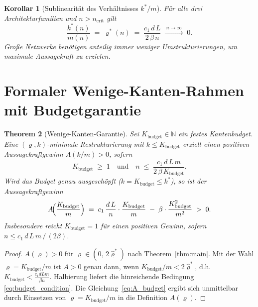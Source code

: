 \documentclass[12pt, a4paper, openany]{report}
\newtheorem{theorem}{Theorem}[chapter]
\newtheorem{corollary}[theorem]{Korollar}
\newcommand{\N}{\mathbb{N}}
\begin{document}
\begin{corollary}[Sublinearität des Verhältnisses $k^*/m$]
\label{cor:k_over_m}
Für alle drei Architekturfamilien und $n > n_{\mathrm{crit}}$ gilt
\[
  \frac{k^*(n)}{m(n)} \;=\; \varrho^*(n) \;=\;
  \frac{c_1\,d\,L}{2\,\beta\,n}
  \;\xrightarrow{\;n\to\infty\;}\; 0.
\]
Große Netzwerke benötigen \emph{anteilig immer weniger Umstrukturierungen},
um maximale Aussagekraft zu erzielen.
\end{corollary}

\section{Formaler Wenige-Kanten-Rahmen mit Budgetgarantie}
\label{sec:scaling_budget}

\begin{theorem}[Wenige-Kanten-Garantie]
\label{thm:few_edges_guarantee}
Sei $K_{\mathrm{budget}} \in \N$ ein festes Kantenbudget.  Eine
$(\varrho, k)$-minimale Restrukturierung mit $k \leq K_{\mathrm{budget}}$
erzielt einen positiven Aussagekraftgewinn $A(k/m) > 0$, sofern
\begin{equation}
  \label{eq:budget_condition}
  K_{\mathrm{budget}} \;\geq\; 1
  \quad\text{und}\quad
  n \;\leq\; \frac{c_1\,d\,L\,m}{2\,\beta\,K_{\mathrm{budget}}}.
\end{equation}
Wird das Budget genau ausgeschöpft ($k = K_{\mathrm{budget}} \leq k^*$), so ist
der Aussagekraftgewinn
\begin{equation}
  \label{eq:A_budget}
  A\!\Bigl(\frac{K_{\mathrm{budget}}}{m}\Bigr)
  \;=\; c_1\,\frac{d\,L}{n}\cdot\frac{K_{\mathrm{budget}}}{m}
  \;-\; \beta\cdot\frac{K_{\mathrm{budget}}^2}{m^2}
  \;>\; 0.
\end{equation}
Insbesondere reicht $K_{\mathrm{budget}} = 1$ für einen positiven Gewinn,
sofern $n \leq c_1\,d\,L\,m\,/\,(2\beta)$.
\end{theorem}

\begin{proof}
$A(\varrho) > 0$ für $\varrho \in (0,\,2\hat\varrho^*)$ nach
Theorem~\ref{thm:main}.  Mit der Wahl $\varrho = K_{\mathrm{budget}}/m$ ist
$A > 0$ genau dann, wenn $K_{\mathrm{budget}}/m < 2\hat\varrho^*$, d.h.\
$K_{\mathrm{budget}} < \frac{c_1 dLm}{\beta n}$.  Halbierung liefert
die hinreichende Bedingung \eqref{eq:budget_condition}.  Die
Gleichung~\eqref{eq:A_budget} ergibt sich unmittelbar durch Einsetzen von
$\varrho = K_{\mathrm{budget}}/m$ in die Definition $A(\varrho)$.
\end{proof}
\end{document}
